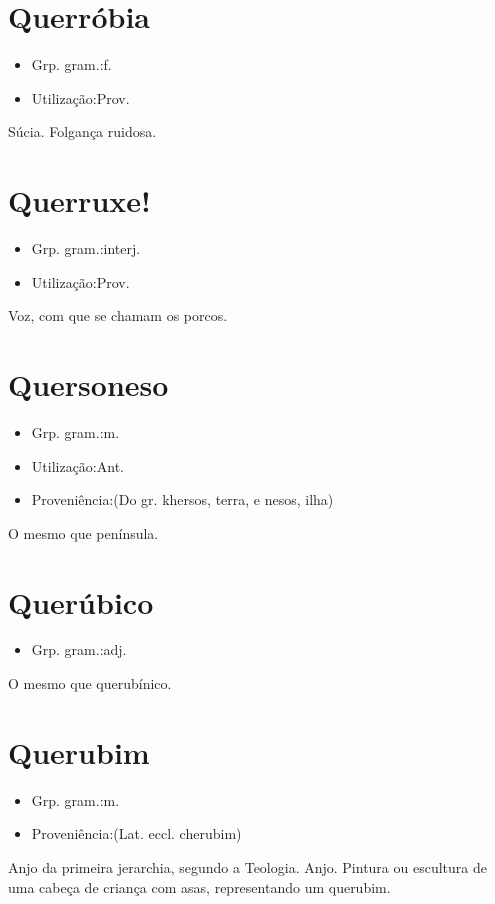 \section{Querróbia}
\begin{itemize}
\item {Grp. gram.:f.}
\end{itemize}
\begin{itemize}
\item {Utilização:Prov.}
\end{itemize}
Súcia.
Folgança ruidosa.
\section{Querruxe!}
\begin{itemize}
\item {Grp. gram.:interj.}
\end{itemize}
\begin{itemize}
\item {Utilização:Prov.}
\end{itemize}
Voz, com que se chamam os porcos.
\section{Quersoneso}
\begin{itemize}
\item {Grp. gram.:m.}
\end{itemize}
\begin{itemize}
\item {Utilização:Ant.}
\end{itemize}
\begin{itemize}
\item {Proveniência:(Do gr. \textunderscore khersos\textunderscore , terra, e \textunderscore nesos\textunderscore , ilha)}
\end{itemize}
O mesmo que \textunderscore península\textunderscore .
\section{Querúbico}
\begin{itemize}
\item {Grp. gram.:adj.}
\end{itemize}
O mesmo que \textunderscore querubínico\textunderscore .
\section{Querubim}
\begin{itemize}
\item {Grp. gram.:m.}
\end{itemize}
\begin{itemize}
\item {Proveniência:(Lat. eccl. \textunderscore cherubim\textunderscore )}
\end{itemize}
Anjo da primeira jerarchia, segundo a Teologia.
Anjo.
Pintura ou escultura de uma cabeça de criança com asas, representando um querubim.
